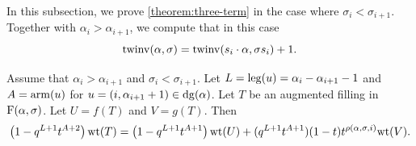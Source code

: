 In this subsection, we prove \cref{theorem:three-term} in the case where \(\sigma_i < \sigma_{i+1}\).
Together with \(\alpha_i > \alpha_{i+1}\), we compute that in this case
\begin{equation*}
    \operatorname{twinv}(\alpha, \sigma) = \operatorname{twinv}(s_i \cdot \alpha, \sigma s_i) + 1.
\end{equation*}

\begin{lemma}
    \label{lem:three-term-bijective-b}
    Assume that \(\alpha_i > \alpha_{i+1}\) and \(\sigma_i < \sigma_{i+1}\).
    Let \(L = \operatorname{leg}(u) = \alpha_i - \alpha_{i+1} - 1\) and \(A = \operatorname{arm}(u)\) for \(u = (i, \alpha_{i+1} + 1) \in \dg(\alpha)\).
    Let \(T\) be an augmented filling in \(\Fill(\alpha, \sigma)\).
    Let \(U = f(T)\) and \(V = g(T)\).
    Then
    \begin{equation} \label{eq:three-term-bijective-b}
        \left( 1 - q^{L+1} t^{A + 2} \right) \wt(T)
        =
        \left( 1 - q^{L+1} t^{A + 1} \right) \wt(U)
        +
        (q^{L+1} t^{A+1}) (1 - t) t^{\rho(\alpha,\sigma,i)} \wt(V).
    \end{equation}
\end{lemma}
